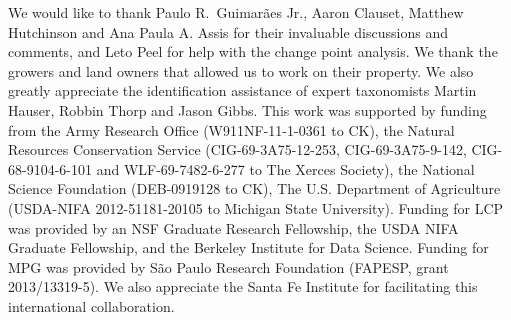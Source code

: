 \documentclass[12pt]{article}
\begin{document}
We would like to thank Paulo R.~Guimar{\~a}es Jr., Aaron Clauset,
Matthew Hutchinson and Ana Paula A. Assis for their invaluable discussions and comments, and
Leto Peel for help with the change point analysis.  We thank the
growers and land owners that allowed us to work on their property. We
also greatly appreciate the identification assistance of expert
taxonomists Martin Hauser, Robbin Thorp and Jason Gibbs.  This work
was supported by funding from the Army Research Office
(W911NF-11-1-0361 to CK), the Natural Resources Conservation Service
(CIG-69-3A75-12-253, CIG-69-3A75-9-142, CIG-68-9104-6-101 and
WLF-69-7482-6-277 to The Xerces Society), the National Science
Foundation (DEB-0919128 to CK), The U.S.  Department of Agriculture
(USDA-NIFA 2012-51181-20105 to Michigan State University).  Funding
for LCP was provided by an NSF Graduate Research Fellowship, the USDA
NIFA Graduate Fellowship, and the Berkeley Institute for Data
Science. Funding for MPG was provided by S{\~a}o Paulo Research
Foundation (FAPESP, grant 2013/13319-5). We also appreciate the Santa
Fe Institute for facilitating this international collaboration.




\end{document}
